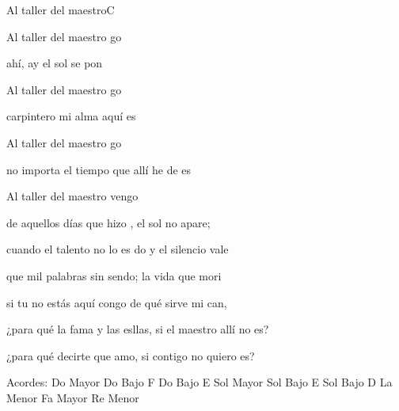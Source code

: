 \documentclass[12pt, spanish]{book}
\begin{document}
\begin{song}{Al taller del maestro}{C}
        \begin{SBOpGroup}
            Al taller del maestro go

            ahí, ay el sol se pon

            Al taller del maestro go

            carpintero mi alma aquí es

            Al taller del maestro go

            no importa el tiempo que allí he de es

            Al taller del maestro vengo
        \end{SBOpGroup}
        \vskip 20pt
        \begin{SBOpGroup}
             de aquellos días que hizo , el sol no apare;

            cuando el talento no lo es do y el silencio vale 

            que mil palabras sin sendo; la vida que mori

            si tu no estás aquí congo de qué sirve mi can,

            ¿para qué la fama y las esllas, si el maestro allí no es?

            ¿para qué decirte que  amo, si contigo no quiero es?
        \end{SBOpGroup}

        \ifChordBk
        \begin{SBOpGroup}
            Acordes:\break
            \upchord{\C}\qquad Do Mayor \hfill
            \upchord{\CF}\qquad Do Bajo F \hfill\null\break
            \upchord{\CE}\qquad Do Bajo E \hfill
            \upchord{\G}\qquad Sol Mayor \hfill\null\break
            \upchord{\GE}\qquad Sol Bajo E \hfill
            \upchord{\GD}\qquad Sol Bajo D \hfill\null\break
            \upchord{\Am}\qquad La Menor \hfill
            \upchord{\F}\qquad Fa Mayor \hfill\null\break
            \upchord{\Dm}\qquad Re Menor \hfill\null\break
        \end{SBOpGroup}
        \fi
    \end{song}
\end{document}
